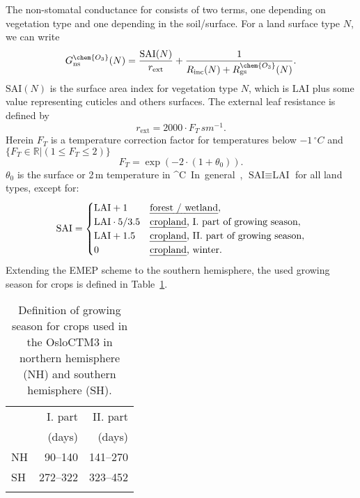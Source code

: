 \documentclass[gmd, manuscript]{copernicus}
\begin{document}
The non-stomatal conductance for  consists of two terms, one depending on vegetation type and one depending in the soil/surface. For a land surface type $N$, we can write
\begin{equation}
  G_\text{ns}^\chem{O_3}(N) = \frac{\text{SAI}(N)}{r_\text{ext}} + \frac{1}{R_\text{inc}(N) + R_\text{gs}^\chem{O_3}(N)}.
\end{equation}
$\text{SAI}(N)$ is the surface area index for vegetation type $N$, which is $\text{LAI}$ plus some value representing cuticles and others surfaces. The external leaf resistance is defined by
\begin{equation}
  r_\text{ext} = 2000\cdot F_T\,\unit{sm^{-1}}.
\end{equation}
Herein $F_T$ is a temperature correction factor for temperatures below $-1\,\unit{^\circ C}$ and $\{F_T \in \mathbb{R} | (1 \leq F_T \leq 2)\}$
\begin{equation}
  F_T = \exp{(-2\cdot(1+\theta_0))}.
\end{equation}
$\theta_0$ is the surface or 2\,\unit{m} temperature in \unit{^\circ C}. In general, $\text{SAI} \equiv \text{LAI}$ for all land types, except for: 
%
\begin{equation}
  \text{SAI} = 
  \begin{cases}
    \text{LAI}+1 & \text{\emph{forest / wetland}},\\
    \text{LAI}\cdot 5/3.5 & \text{\emph{cropland}, I. part of growing season},\\
    \text{LAI} + 1.5 & \text{\emph{cropland}, II. part of growing season},\\
    0 & \text{\emph{cropland}, winter}.
  \end{cases}
\end{equation}
%
Extending the EMEP scheme to the southern hemisphere, the used growing season for crops is defined in Table~\ref{tab:growing_season}.
\begin{table}[t]
  \caption{Definition of growing season for crops used in the OsloCTM3 in northern hemisphere (NH) and southern hemisphere (SH).}
  \begin{tabular}{lrr}
    \tophline
    & I. part & II. part \\
    & (days) & (days) \\
    \middlehline
    NH & 90--140 & 141--270 \\
    SH & 272--322 & 323--452 \\
    \bottomhline
  \end{tabular}
  \label{tab:growing_season}
\end{table}
%
\end{document}
